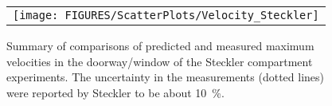 \begin{figure}[p]
\begin{center}
\begin{tabular}{l}
\texttt{[image: FIGURES/ScatterPlots/Velocity\_Steckler]}
\end{tabular}
\end{center}
\caption[Summary of velocity predictions, Steckler compartment experiments.]
{Summary of comparisons of predicted and measured maximum velocities in the doorway/window of the Steckler compartment experiments. The uncertainty
in the measurements (dotted lines) were reported by Steckler to be about 10~\%.}
\label{Steckler_Scatterplot}
\end{figure}










